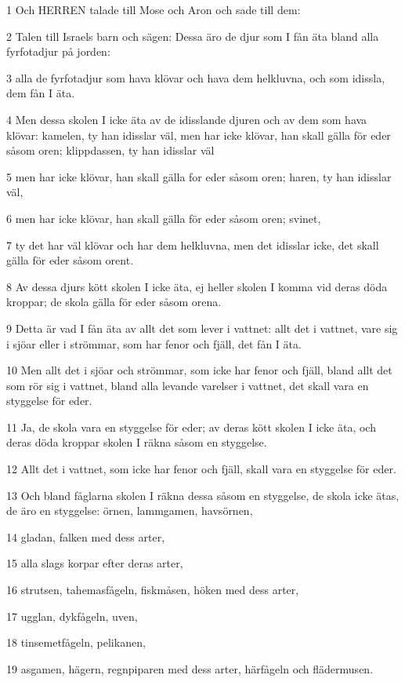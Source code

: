 \par 1 Och HERREN talade till Mose och Aron och sade till dem:
\par 2 Talen till Israels barn och sägen: Dessa äro de djur som I fån äta bland alla fyrfotadjur på jorden:
\par 3 alla de fyrfotadjur som hava klövar och hava dem helkluvna, och som idissla, dem fån I äta.
\par 4 Men dessa skolen I icke äta av de idisslande djuren och av dem som hava klövar: kamelen, ty han idisslar väl, men har icke klövar, han skall gälla för eder såsom oren; klippdassen, ty han idisslar väl
\par 5 men har icke klövar, han skall gälla for eder såsom oren; haren, ty han idisslar väl,
\par 6 men har icke klövar, han skall gälla för eder såsom oren; svinet,
\par 7 ty det har väl klövar och har dem helkluvna, men det idisslar icke, det skall gälla för eder såsom orent.
\par 8 Av dessa djurs kött skolen I icke äta, ej heller skolen I komma vid deras döda kroppar; de skola gälla för eder såsom orena.
\par 9 Detta är vad I fån äta av allt det som lever i vattnet: allt det i vattnet, vare sig i sjöar eller i strömmar, som har fenor och fjäll, det fån I äta.
\par 10 Men allt det i sjöar och strömmar, som icke har fenor och fjäll, bland allt det som rör sig i vattnet, bland alla levande varelser i vattnet, det skall vara en styggelse för eder.
\par 11 Ja, de skola vara en styggelse för eder; av deras kött skolen I icke äta, och deras döda kroppar skolen I räkna såsom en styggelse.
\par 12 Allt det i vattnet, som icke har fenor och fjäll, skall vara en styggelse för eder.
\par 13 Och bland fåglarna skolen I räkna dessa såsom en styggelse, de skola icke ätas, de äro en styggelse: örnen, lammgamen, havsörnen,
\par 14 gladan, falken med dess arter,
\par 15 alla slags korpar efter deras arter,
\par 16 strutsen, tahemasfågeln, fiskmåsen, höken med dess arter,
\par 17 ugglan, dykfågeln, uven,
\par 18 tinsemetfågeln, pelikanen,
\par 19 asgamen, hägern, regnpiparen med dess arter, härfågeln och flädermusen.
